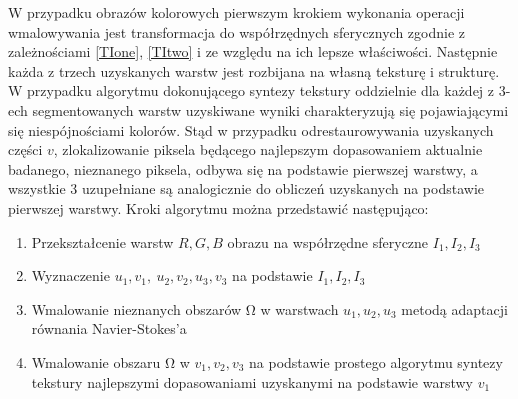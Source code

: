\documentclass[12pt, twoside, openany]{report}
\theoremstyle{definition}
\begin{document}
 W przypadku obrazów kolorowych pierwszym krokiem wykonania operacji wmalowywania jest transformacja do współrzędnych sferycznych zgodnie z zależnościami \eqref{TIone}, \eqref{TItwo} i \cite{TIthree} ze względu na ich lepsze właściwości. Następnie każda z trzech uzyskanych warstw jest rozbijana na własną teksturę i strukturę. W przypadku algorytmu dokonującego syntezy tekstury oddzielnie dla każdej z 3-ech segmentowanych warstw uzyskiwane wyniki charakteryzują się pojawiającymi się niespójnościami kolorów. Stąd w przypadku odrestaurowywania uzyskanych części $v$, zlokalizowanie piksela będącego najlepszym dopasowaniem aktualnie badanego, nieznanego piksela, odbywa się na podstawie pierwszej warstwy, a wszystkie 3 uzupełniane są analogicznie do obliczeń uzyskanych na podstawie pierwszej warstwy. Kroki algorytmu można przedstawić następująco:
\begin{enumerate}
\item
Przekształcenie warstw $R,G,B$ obrazu na współrzędne sferyczne $I_1,I_2,I_3$
\item
Wyznaczenie $u_1,v_1,\ u_2,v_2,u_3,v_3$ na podstawie $I_1,I_2,I_3$
\item
Wmalowanie nieznanych obszarów $\mathrm{\Omega }$ w warstwach $u_1,u_2,u_3$ metodą adaptacji równania Navier-Stokes'a
\item
Wmalowanie obszaru $\mathrm{\Omega }$ w $v_1,v_2,v_3$ na podstawie prostego algorytmu syntezy tekstury najlepszymi dopasowaniami uzyskanymi na podstawie warstwy $v_1$
\end{enumerate}
\end{document}
